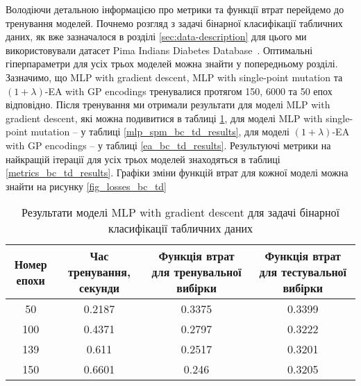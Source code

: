 Володіючи детальною інформацією про метрики та функції втрат перейдемо до тренування моделей. Почнемо розгляд з задачі бінарної класифікації табличних даних, як вже зазначалося в розділі \ref{sec:data-description} для цього ми використовували датасет Pima Indians Diabetes Database~\cite{ct30}. Оптимальні гіперпараметри для усіх трьох моделей можна знайти у попередньому розділі. Зазначимо, що MLP with gradient descent, MLP with single-point mutation та $(1+\lambda)$-EA with GP encodings тренувалися протягом 150, 6000 та 50 епох відповідно. Після тренування ми отримали результати для моделі MLP with gradient descent, які можна подивитися в таблиці \ref{mlp_gd_bc_td_results}, для моделі MLP with single-point mutation -- у таблиці \ref{mlp_spm_bc_td_results}, для моделі $(1+\lambda)$-EA with GP encodings -- у таблиці \ref{ea_bc_td_results}. Результуючі метрики на найкращій ітерації для усіх трьох моделей знаходяться в таблиці \ref{metrics_bc_td_results}. Графіки зміни функцій втрат для кожної моделі можна знайти на рисунку \ref{fig_losses_bc_td}

\begin{table}[ht]
	\caption{Результати моделі MLP with gradient descent для задачі бінарної класифікації табличних даних}
	\label{mlp_gd_bc_td_results}
	\centering
	\begin{adjustbox}{max width=\textwidth}
		\begin{tabular}{|c|c|c|c|}
			\hline 
			Номер епохи & Час тренування, секунди & Функція втрат для тренувальної вибірки & Функція втрат для тестувальної вибірки \\
			\hline 
			50 & 0.2187 & 0.3375 & 0.3399 \\
			\hline 
			100 & 0.4371 & 0.2797 & 0.3222 \\
			\hline
			139 & 0.611 & 0.2517 & 0.3201 \\
			\hline
			150 & 0.6601& 0.246 & 0.3205 \\
			\hline
		\end{tabular}
	\end{adjustbox}
\end{table}

